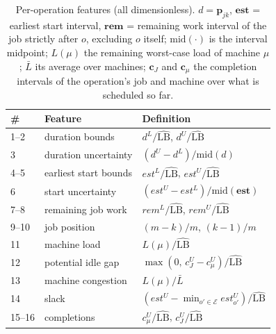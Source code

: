\documentclass[preprint,12pt]{elsarticle}
\newcommand{\LBi}{\widehat{\mathrm{LB}}}
\theoremstyle{definition}
\theoremstyle{remark}
\begin{document}
\begin{table}[!htb]
\centering\small
\caption{Per-operation features (all dimensionless). $d=\mathbf{p}_{jk}$,
$\mathbf{est}$ = earliest start interval, $\mathbf{rem}$ = remaining work
interval of the job strictly after $o$, excluding $o$ itself;
$\mathrm{mid}(\cdot)$ is the interval
midpoint; $L(\mu)$ the remaining worst-case load of machine $\mu$;
$\bar L$ its average over machines; $\mathbf{c}_{J}$ and
$\mathbf{c}_{\mu}$ the completion intervals of the operation's job
and machine over what is scheduled so far.}
\label{tab:opfeatures}
\begin{tabular*}{\textwidth}{@{\extracolsep{\fill}}lll}
\toprule
\# & Feature & Definition \\
\midrule
1--2 & duration bounds & $d^L/\LBi$, $d^U/\LBi$ \\
3 & duration uncertainty & $(d^U-d^L)/\mathrm{mid}(d)$ \\
4--5 & earliest start bounds & $est^L/\LBi$, $est^U/\LBi$ \\
6 & start uncertainty & $(est^U-est^L)/\mathrm{mid}(\mathbf{est})$ \\
7--8 & remaining job work & $rem^L/\LBi$, $rem^U/\LBi$ \\
9--10 & job position & $(m-k)/m$, $(k-1)/m$ \\
11 & machine load & $L(\mu)/\LBi$ \\
12 & potential idle gap & $\max(0,\,c^U_{J}-c^U_{\mu})/\LBi$ \\
13 & machine congestion & $L(\mu)/\bar L$ \\
14 & slack & $(est^U-\min_{o'\in\mathcal{E}}est^U_{o'})/\LBi$ \\
15--16 & completions & $c^U_{\mu}/\LBi$, $c^U_{J}/\LBi$ \\
\bottomrule
\end{tabular*}
\end{table}
\end{document}
